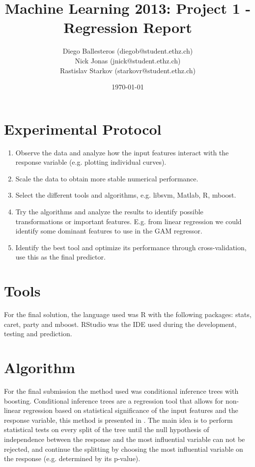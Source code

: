 \documentclass[a4paper, 11pt]{article}
\title{Machine Learning 2013: Project 1 - Regression Report}
\author{Diego Ballesteros (diegob@student.ethz.ch)\\ Nick Jonas (jnick@student.ethz.ch)\\ Rastislav Starkov (starkovr@student.ethz.ch)\\}
\date{\today}
\begin{document}
\maketitle

\section*{Experimental Protocol}

\begin{enumerate}
	\item Observe the data and analyze how the input features interact with the response variable (e.g. plotting individual curves).
	\item Scale the data to obtain more stable numerical performance.
	\item Select the different tools and algorithms, e.g. libsvm, Matlab, R, mboost.
	\item Try the algorithms and analyze the results to identify possible transformations or important features. E.g. from linear regression we could identify some dominant features to use in the GAM regressor.
	\item Identify the best tool and optimize its performance through cross-validation, use this as the final predictor.
\end{enumerate}

\section{Tools}
For the final solution, the language used was R with the following packages: stats, caret, party and mboost. RStudio was the IDE used during the development, testing and prediction.

\section{Algorithm}
For the final submission the method used was conditional inference trees with boosting. Conditional inference trees are a regression tool that allows for non-linear regression based on statistical significance of the input features and the response variable, this method is presented in \cite{Hothorn2005}. The main idea is to perform statistical tests on every split of the tree until the null hypothesis of independence between the response and the most influential variable can not be rejected, and continue the splitting by choosing the most influential variable on the response (e.g. determined by its p-value).
\end{document}
